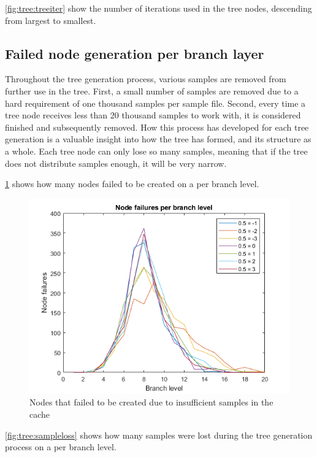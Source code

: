 \cref{fig:tree:treeiter} show the number of iterations used in the tree nodes, descending from largest to smallest.

\subsection{Failed node generation per branch layer}
Throughout the tree generation process, various samples are removed from further use in the tree.
First, a small number of samples are removed due to a hard requirement of one thousand samples per sample file.
Second, every time a tree node receives less than 20 thousand samples to work with, it is considered finished and subsequently removed.
How this process has developed for each tree generation is a valuable insight into how the tree has formed, and its structure as a whole.
Each tree node can only lose so many samples, meaning that if the tree does not distribute samples enough, it will be very narrow.

\cref{fig:tree:nodefail} shows how many nodes failed to be created on a per branch level.

\begin{figure}  %
  \centering
  \includegraphics[width=.7\textwidth]{figures/treenodefail.png}
  \caption{Nodes that failed to be created due to insufficient samples in the cache}
  \label{fig:tree:nodefail}
\end{figure}

\cref{fig:tree:sampleloss} shows how many samples were lost during the tree generation process on a per branch level.

